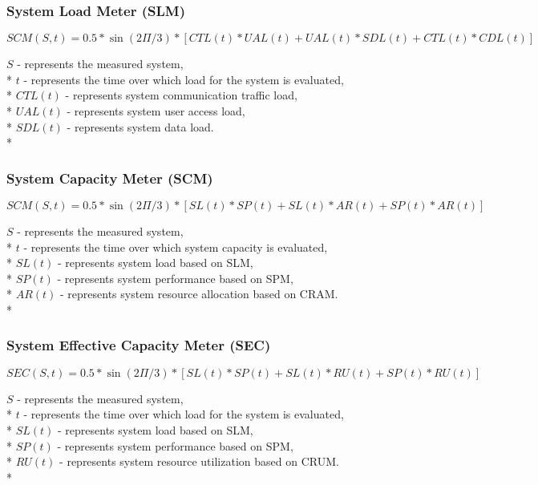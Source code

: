 \documentclass{uvamscse}
\begin{document}
\subsubsection{System Load Meter (SLM)}
\begin{center}
  $$SCM(S,t) = 0.5 * \sin(2\Pi/3) * [CTL(t)*UAL(t)+UAL(t)*SDL(t)+CTL(t)*CDL(t)]$$
\end{center}
  \texttt{$S$} - represents the measured system, \\*
  \texttt{$t$} - represents the time over which load for the system is evaluated, \\*
  \texttt{$CTL(t)$} - represents system communication traffic load, \\*
  \texttt{$UAL(t)$} - represents system user access load, \\*
  \texttt{$SDL(t)$} - represents system data load. \\*

\subsubsection{System Capacity Meter (SCM)}
\begin{center}
  $$SCM(S,t) = 0.5 * \sin(2\Pi/3) * [SL(t)*SP(t)+SL(t)*AR(t)+SP(t)*AR(t)]$$
\end{center}
  \texttt{$S$} - represents the measured system, \\*
  \texttt{$t$} - represents the time over which system capacity is evaluated, \\*
  \texttt{$SL(t)$} - represents system load based on SLM, \\*
  \texttt{$SP(t)$} - represents system performance based on SPM, \\*
  \texttt{$AR(t)$} - represents system resource allocation based on CRAM. \\*

\subsubsection{System Effective Capacity Meter (SEC)}
\begin{center}
  $$SEC(S,t) = 0.5 * \sin(2\Pi/3) * [SL(t)*SP(t)+SL(t)*RU(t)+SP(t)*RU(t)]$$
\end{center}
  \texttt{$S$} - represents the measured system, \\*
  \texttt{$t$} - represents the time over which load for the system is evaluated, \\*
  \texttt{$SL(t)$} - represents system load based on SLM, \\*
  \texttt{$SP(t)$} - represents system performance based on SPM, \\*
  \texttt{$RU(t)$} - represents system resource utilization based on CRUM. \\*
\end{document}
